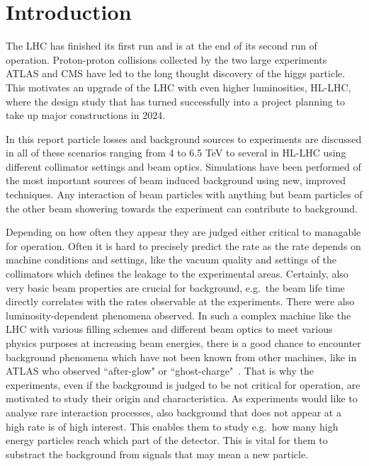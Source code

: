 \section{Introduction}


The LHC has finished its first run and is at the end of its second run of operation. Proton-proton collisions collected by the two large experiments ATLAS and CMS have led to the long thought discovery of the higgs particle. This motivates an upgrade of the LHC with even higher luminosities, HL-LHC, where the design study that has turned successfully into a project planning to take up major constructions in 2024.

In this report particle losses and background sources to experiments are discussed in all of these scenarios ranging from 4 to 6.5 TeV to several in HL-LHC using different collimator settings and beam optics. Simulations have been performed of the most important sources of beam induced background using new, improved techniques. Any interaction of beam particles with anything but beam particles of the other beam showering towards the experiment can contribute to background.

Depending on how often they appear they are judged either critical to managable for operation. Often it is hard to precisely predict the rate as the rate depends on machine conditions and settings, like the vacuum quality and settings of the collimators which defines the leakage to the experimental areas. Certainly, also very basic beam properties are crucial for background, e.g.~the beam life time directly correlates with the rates observable at the experiments. There were also luminosity-dependent phenomena observed. In such a complex machine like the LHC with various filling schemes and different beam optics to meet various physics purposes at increasing beam energies, there is a good chance to encounter background phenomena which have not been known from other machines, like in ATLAS who observed ``after-glow" or ``ghost-charge"~\cite{ATLAS_JINST_13}. That is why the experiments, even if the background is judged to be not critical for operation, are motivated to study their origin and characteristica. As experiments would like to analyse rare interaction processes, also background that does not appear at a high rate is of high interest. This enables them to study e.g.~how many high energy particles reach which part of the detector. This is vital for them to substract the background from signals that may mean a new particle. 

